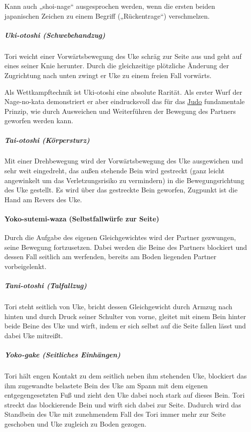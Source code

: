 \documentclass[justified, a4paper, notitlepage, captions=tableheading, nobib]{tufte-handout}
\begin{document}
Kann auch „shoi-nage“ ausgesprochen werden, wenn die ersten beiden japanischen Zeichen zu einem Begriff („Rückentrage“) verschmelzen.

\subparagraph{Uki-otoshi (Schwebehandzug)}
\label{sec:orgb8fbd82}
Tori weicht einer Vorwärtsbewegung des Uke schräg zur Seite aus und geht auf eines seiner Knie herunter. Durch die gleichzeitige plötzliche Änderung der Zugrichtung nach unten zwingt er Uke zu einem freien Fall vorwärts.

Als Wettkampftechnik ist Uki-otoshi eine absolute Rarität. Als erster Wurf der Nage-no-kata demonstriert er aber eindrucksvoll das für das \hyperref[org6f56467]{Judo} fundamentale Prinzip, wie durch Ausweichen und Weiterführen der Bewegung des Partners geworfen werden kann.

\subparagraph{Tai-otoshi (Körpersturz)}
\label{sec:org7d2ac24}
Mit einer Drehbewegung wird der Vorwärtsbewegung des Uke ausgewichen und sehr weit eingedreht, das außen stehende Bein wird gestreckt (ganz leicht angewinkelt um das Verletzungsrisiko zu vermindern) in die Bewegungsrichtung des Uke gestellt. Es wird über das gestreckte Bein geworfen, Zugpunkt ist die Hand am Revers des Uke.

\paragraph{Yoko-sutemi-waza (Selbstfallwürfe zur Seite) }
\label{sec:orgb51839c}

Durch die Aufgabe des eigenen Gleichgewichtes wird der Partner gezwungen, seine Bewegung fortzusetzen. Dabei werden die Beine des Partners blockiert und dessen Fall seitlich am werfenden, bereits am Boden liegenden Partner vorbeigelenkt. 

\subparagraph{Tani-otoshi (Talfallzug)}
\label{sec:orgeaf1d89}
Tori steht seitlich von Uke, bricht dessen Gleichgewicht durch Armzug nach hinten und durch Druck seiner Schulter von vorne, gleitet mit einem Bein hinter beide Beine des Uke und wirft, indem er sich selbst auf die Seite fallen lässt und dabei Uke mitreißt.

\subparagraph{Yoko-gake (Seitliches Einhängen)}
\label{sec:orga9f757d}
Tori hält engen Kontakt zu dem seitlich neben ihm stehenden Uke, blockiert das ihm zugewandte belastete Bein des Uke am Spann mit dem eigenen entgegengesetzten Fuß und zieht den Uke dabei noch stark auf dieses Bein. Tori streckt das blockierende Bein und wirft sich dabei zur Seite. Dadurch wird das Standbein des Uke mit zunehmendem Fall des Tori immer mehr zur Seite geschoben und Uke zugleich zu Boden gezogen.
\end{document}
